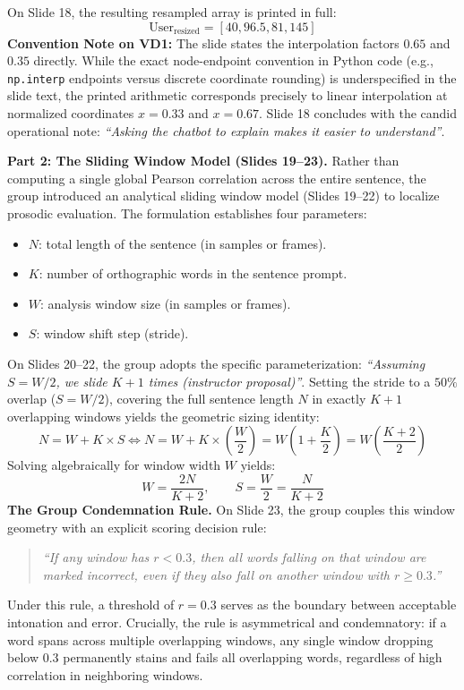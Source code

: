 \documentclass[11pt,a4paper]{article}
\begin{document}
On Slide 18, the resulting resampled array is printed in full:
\begin{equation}
\text{User}_{\text{resized}} = [40, 96.5, 81, 145]
\end{equation}
\textbf{Convention Note on VD1:} The slide states the interpolation factors $0.65$ and $0.35$ directly. While the exact node-endpoint convention in Python code (e.g., \texttt{np.interp} endpoints versus discrete coordinate rounding) is underspecified in the slide text, the printed arithmetic corresponds precisely to linear interpolation at normalized coordinates $x = 0.33$ and $x = 0.67$. Slide 18 concludes with the candid operational note: \textit{``Asking the chatbot to explain makes it easier to understand''}.

\textbf{Part 2: The Sliding Window Model (Slides 19--23).} Rather than computing a single global Pearson correlation across the entire sentence, the group introduced an analytical sliding window model (Slides 19--22) to localize prosodic evaluation. The formulation establishes four parameters:
\begin{itemize}
    \item $N$: total length of the sentence (in samples or frames).
    \item $K$: number of orthographic words in the sentence prompt.
    \item $W$: analysis window size (in samples or frames).
    \item $S$: window shift step (stride).
\end{itemize}
On Slides 20--22, the group adopts the specific parameterization: \textit{``Assuming $S = W / 2$, we slide $K + 1$ times (instructor proposal)''}. Setting the stride to a $50\%$ overlap ($S = W/2$), covering the full sentence length $N$ in exactly $K+1$ overlapping windows yields the geometric sizing identity:
\begin{equation}
N = W + K \times S \iff N = W + K \times \left(\frac{W}{2}\right) = W \left(1 + \frac{K}{2}\right) = W \left(\frac{K+2}{2}\right)
\end{equation}
Solving algebraically for window width $W$ yields:
\begin{equation}
W = \frac{2N}{K+2}, \qquad S = \frac{W}{2} = \frac{N}{K+2}
\label{eq:window_sizing}
\end{equation}
\textbf{The Group Condemnation Rule.} On Slide 23, the group couples this window geometry with an explicit scoring decision rule:
\begin{quote}
\textit{``If any window has $r < 0.3$, then all words falling on that window are marked incorrect, even if they also fall on another window with $r \ge 0.3$.''}
\end{quote}
Under this rule, a threshold of $r = 0.3$ serves as the boundary between acceptable intonation and error. Crucially, the rule is asymmetrical and condemnatory: if a word spans across multiple overlapping windows, any single window dropping below $0.3$ permanently stains and fails all overlapping words, regardless of high correlation in neighboring windows.
\end{document}

